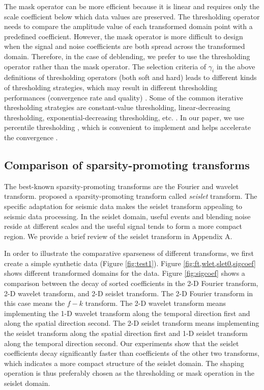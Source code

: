 The mask operator can be more efficient because it is linear and requires only the scale coefficient below which data values are preserved. The thresholding operator needs to compare the amplitude value of each transformed domain point with a predefined coefficient. However, the mask operator is more difficult to design when the signal and noise coefficients are both spread across the transformed domain. Therefore, in the case of deblending, we prefer to use the thresholding operator rather than the mask operator. The selection criteria of $\gamma_i$ in the above definitions of thresholding operators (both soft and hard) leads to different kinds of thresholding strategies, which may result in different thresholding performances (convergence rate and quality) \cite[]{pengliang2013}. Some of the common iterative thresholding strategies are constant-value thresholding, linear-decreasing thresholding, exponential-decreasing thresholding, etc. \cite[]{jianjun2010}.  In our paper, we use percentile thresholding \cite[]{dian2008,pengliang20121}, which is convenient to implement and helps accelerate the convergence \cite[]{pengliang20121}.

\subsection{Comparison of sparsity-promoting transforms}
The best-known sparsity-promoting transforms are the Fourier and wavelet transform. \cite{seislet} proposed a sparsity-promoting transform called \emph{seislet} transform. The specific adaptation for seismic data makes the seislet transform appealing to seismic data processing. In the seislet domain, useful events and blending noise reside at different scales and the useful signal tends to form a more compact region. We provide a brief review of the seislet transform in Appendix A.

In order to illustrate the comparative sparseness of different transforms, we first create a simple synthetic data (Figure \ref{fig:test1}). Figure \ref{fig:ft,wlet,slet0,sigcoef} shows different transformed domains for the data. Figure \ref{fig:sigcoef} shows a comparison between the decay of sorted coefficients in the 2-D Fourier transform, 2-D wavelet transform, and 2-D seislet transform. The 2-D Fourier transform in this case means the $f-k$ transform. The 2-D wavelet transform means implementing the 1-D wavelet transform along the temporal direction first and along the spatial direction second. The 2-D seislet transform means implementing the seislet transform along the spatial direction first and 1-D seislet transform along the temporal direction second. Our experiments show that the seislet coefficients decay significantly faster than coefficients of the other two transforms, which indicates a more compact structure of the seislet domain. The shaping operation is thus preferably chosen as the thresholding or mask operation in the seislet domain.

